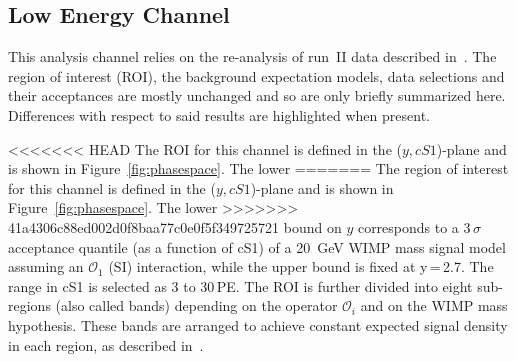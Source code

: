 
\subsection{Low Energy Channel}
\label{subsec:LowE}
This analysis channel relies on the re-analysis of run~II data described in~\cite{xe100_run_combination}. The region of interest (ROI), the background 
expectation models, data selections and their acceptances are mostly unchanged and so are only briefly summarized here. Differences with respect to said results are highlighted when present.

<<<<<<< HEAD
The ROI for this channel is defined in the ($y,cS1$)-plane and is shown in Figure~\ref{fig:phasespace}. The lower 
=======
The region of interest for this channel is defined in the ($y,cS1$)-plane and is shown in Figure~\ref{fig:phasespace}.  The lower 
>>>>>>> 41a4306c88ed002d0f8baa77c0e0f5f349725721
bound on $y$ corresponds to a 3\,$\sigma$ acceptance quantile (as a function of cS1) of a 20~GeV WIMP mass signal model assuming an $\mathcal{O}_1$ (SI) interaction, while the upper bound is fixed at y\,=\,2.7.
The range in cS1 is selected as 3 to 30\,PE. 
The ROI is further divided into eight sub-regions (also called bands) depending on the operator $\mathcal{O}_i$ and on the WIMP mass hypothesis. 
These bands are arranged to achieve constant expected signal density in each region, as described in~\cite{xe100_run_combination}.

